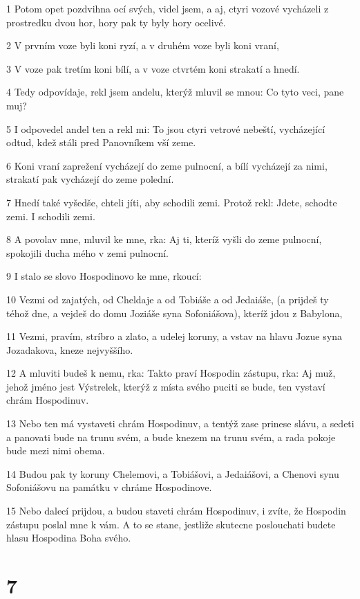\par 1 Potom opet pozdvihna ocí svých, videl jsem, a aj, ctyri vozové vycházeli z prostredku dvou hor, hory pak ty byly hory ocelivé.
\par 2 V prvním voze byli koni ryzí, a v druhém voze byli koni vraní,
\par 3 V voze pak tretím koni bílí, a v voze ctvrtém koni strakatí a hnedí.
\par 4 Tedy odpovídaje, rekl jsem andelu, kterýž mluvil se mnou: Co tyto veci, pane muj?
\par 5 I odpovedel andel ten a rekl mi: To jsou ctyri vetrové nebeští, vycházející odtud, kdež stáli pred Panovníkem vší zeme.
\par 6 Koni vraní zaprežení vycházejí do zeme pulnocní, a bílí vycházejí za nimi, strakatí pak vycházejí do zeme polední.
\par 7 Hnedí také vyšedše, chteli jíti, aby schodili zemi. Protož rekl: Jdete, schodte zemi. I schodili zemi.
\par 8 A povolav mne, mluvil ke mne, rka: Aj ti, kteríž vyšli do zeme pulnocní, spokojili ducha mého v zemi pulnocní.
\par 9 I stalo se slovo Hospodinovo ke mne, rkoucí:
\par 10 Vezmi od zajatých, od Cheldaje a od Tobiáše a od Jedaiáše, (a prijdeš ty téhož dne, a vejdeš do domu Joziáše syna Sofoniášova), kteríž jdou z Babylona,
\par 11 Vezmi, pravím, stríbro a zlato, a udelej koruny, a vstav na hlavu Jozue syna Jozadakova, kneze nejvyššího.
\par 12 A mluviti budeš k nemu, rka: Takto praví Hospodin zástupu, rka: Aj muž, jehož jméno jest Výstrelek, kterýž z místa svého puciti se bude, ten vystaví chrám Hospodinuv.
\par 13 Nebo ten má vystaveti chrám Hospodinuv, a tentýž zase prinese slávu, a sedeti a panovati bude na trunu svém, a bude knezem na trunu svém, a rada pokoje bude mezi nimi obema.
\par 14 Budou pak ty koruny Chelemovi, a Tobiášovi, a Jedaiášovi, a Chenovi synu Sofoniášovu na památku v chráme Hospodinove.
\par 15 Nebo dalecí prijdou, a budou staveti chrám Hospodinuv, i zvíte, že Hospodin zástupu poslal mne k vám. A to se stane, jestliže skutecne poslouchati budete hlasu Hospodina Boha svého.

\chapter{7}

